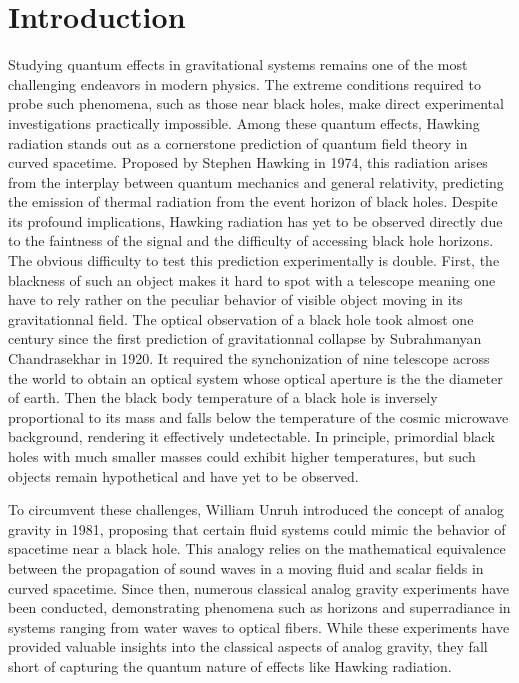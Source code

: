 

\chapter{Introduction}
\label{chap:introduction}

Studying quantum effects in gravitational systems remains one of the most challenging endeavors in modern physics. 
The extreme conditions required to probe such phenomena, such as those near black holes, make direct experimental investigations practically impossible. 
Among these quantum effects, Hawking radiation stands out as a cornerstone prediction of quantum field theory in curved spacetime. Proposed by Stephen Hawking in 1974, this radiation arises from the interplay between quantum mechanics and general relativity, predicting the emission of thermal radiation from the event horizon of black holes. Despite its profound implications, Hawking radiation has yet to be observed directly due to the faintness of the signal and the difficulty of accessing black hole horizons.
 The obvious difficulty to test this prediction experimentally is double. First, the blackness of such an object makes it hard to spot with a telescope meaning one have to rely rather on the peculiar behavior of visible object moving in its gravitationnal field. The optical observation of a black hole took almost one century since the first prediction of gravitationnal collapse by Subrahmanyan Chandrasekhar in 1920. It required 
the synchonization of nine telescope across the world to obtain an optical system whose optical aperture is the the diameter of earth. Then the black body temperature of a black hole is inversely proportional to its mass and falls below the temperature of the cosmic microwave background, rendering it effectively undetectable. In principle, primordial black holes with much smaller masses could exhibit higher temperatures, but such objects remain hypothetical and have yet to be observed.

To circumvent these challenges, William Unruh introduced the concept of analog gravity in 1981, proposing that certain fluid systems could mimic the behavior of spacetime near a black hole. 
This analogy relies on the mathematical equivalence between the propagation of sound waves in a moving fluid and scalar fields in curved spacetime. 
Since then, numerous classical analog gravity experiments have been conducted, demonstrating phenomena such as horizons and superradiance in systems ranging from water waves to optical fibers. While these experiments have provided valuable insights into the classical aspects of analog gravity, they fall short of capturing the quantum nature of effects like Hawking radiation.


